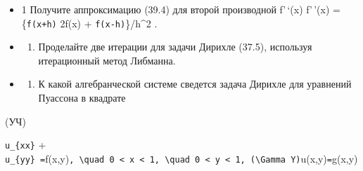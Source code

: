 \documentclass[
  ukrainian,
]{article}
\providecommand{\tightlist}{%
  \setlength{\itemsep}{0pt}\setlength{\parskip}{0pt}}
\begin{document}
\begin{itemize}
\item
  1 Получите аппроксимацию (39.4) для второй производной f'\,`(x)
  f'\,'(x) = \{\texttt{f(x+h)} 2f(x) + \texttt{f(x-h)}\}/h\^{}2 .
\item
  \begin{enumerate}
  \def\labelenumi{\arabic{enumi}.}
  \setcounter{enumi}{1}
  \tightlist
  \item
    Проделайте две итерации для задачи Дирихле (37.5), используя
    итерационный метод Либманна.
  \end{enumerate}
\item
  \begin{enumerate}
  \def\labelenumi{\arabic{enumi}.}
  \setcounter{enumi}{2}
  \tightlist
  \item
    К какой алгебранческой системе сведется задача Дирихле для уравнений
    Пуассона в квадрате
  \end{enumerate}
\end{itemize}

(УЧ\Pi)

\texttt{u\_\{xx\}} +
\texttt{u\_\{yy\}\ =}f(x,y)\texttt{,\ \textbackslash{}quad\ 0\ \textless{}\ x\ \textless{}\ 1,\ \textbackslash{}quad\ 0\ \textless{}\ y\ \textless{}\ 1,\ (\textbackslash{}Gamma\ Y)}u(x,y)\texttt{=}g(x,y)
\end{document}
